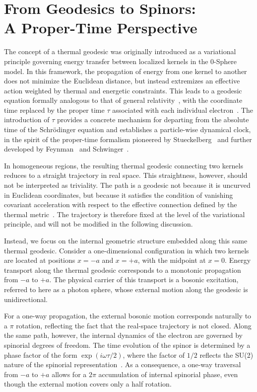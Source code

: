 \documentclass[%
 reprint,
 amsmath,amssymb,
 aps,
 prb,
]{revtex4-2}
\numberwithin{equation}{section}
\begin{document}
\section{From Geodesics to Spinors:\\ A Proper-Time Perspective}
\label{sec:geodesics_spinors}

The concept of a thermal geodesic was originally introduced as a variational principle governing energy transfer between localized kernels in the 0-Sphere model. In this framework, the propagation of energy from one kernel to another does not minimize the Euclidean distance, but instead extremizes an effective action weighted by thermal and energetic constraints. This leads to a geodesic equation formally analogous to that of general relativity~\cite{misner1973,wald1984}, with the coordinate time replaced by the proper time $\tau$ associated with each individual electron~\cite{bjorken1964,ryder1996}. The introduction of $\tau$
provides a concrete mechanism for departing from the
absolute time of the Schr\"odinger equation and establishes
a particle-wise dynamical clock, in the spirit of the
proper-time formalism pioneered by Stueckelberg~\cite{stueckelberg1941}
and further developed by Feynman~\cite{feynman1949}
and Schwinger~\cite{schwinger1951}.

In homogeneous regions, the resulting thermal geodesic connecting two kernels reduces to a straight trajectory in real space. This straightness, however, should not be interpreted as triviality. The path is a geodesic not because it is uncurved in Euclidean coordinates, but because it satisfies the condition of vanishing covariant acceleration with respect to the effective connection defined by the thermal metric~\cite{wald1984,weinberg1972}. The trajectory is therefore fixed at the level of the variational principle, and will not be modified in the following discussion.

Instead, we focus on the internal geometric structure embedded along this same thermal geodesic. Consider a one-dimensional configuration in which two kernels are located at positions $x=-a$ and $x=+a$, with the midpoint at $x=0$. Energy transport along the thermal geodesic corresponds to a monotonic propagation from $-a$ to $+a$. The physical carrier of this transport is a bosonic excitation, referred to here as a photon sphere, whose external motion along the geodesic is unidirectional.

For a one-way propagation, the external bosonic motion corresponds naturally to a $\pi$ rotation, reflecting the fact that the real-space trajectory is not closed. Along the same path, however, the internal dynamics of the electron are governed by spinorial degrees of freedom. The time evolution of the spinor is determined by a phase factor of the form $\exp(i\omega \tau/2)$, where the factor of $1/2$ reflects the SU(2) nature of the spinorial representation~\cite{wigner1939,sakurai2017,shankar2016}. As a consequence, a one-way traversal from $-a$ to $+a$ allows for a $2\pi$ accumulation of internal spinorial phase, even though the external motion covers only a half rotation.
\end{document}
